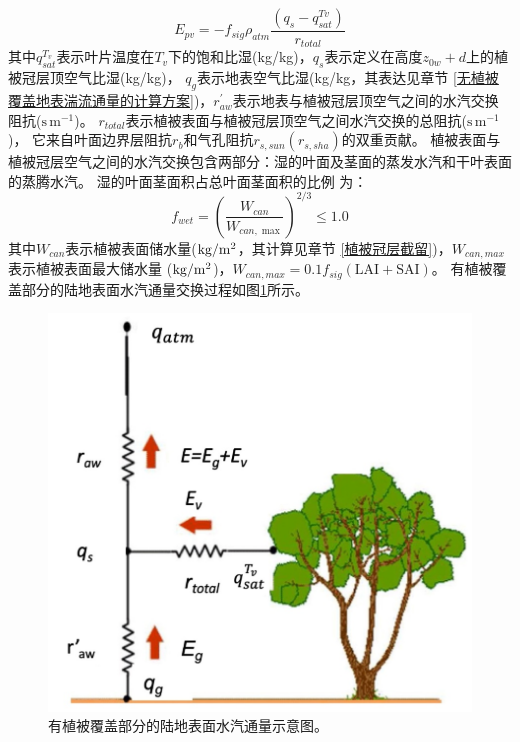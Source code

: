 \begin{equation}
E_{pv}=-f_{sig} \rho_{atm} \frac{\left(q_{s}-q_{s a t}^{T v}\right)}{r_{t o t a l}}
\end{equation}
其中$q_{sat}^{T_v}$表示叶片温度在$T_v$下的饱和比湿(kg/kg)，$q_s$表示定义在高度$z_{0w}+d$上的植被冠层顶空气比湿(kg/kg)，
$q_g$表示地表空气比湿(kg/kg，其表达见章节 \ref{无植被覆盖地表湍流通量的计算方案})，$r_{aw}^\prime$表示地表与植被冠层顶空气之间的水汽交换阻抗($\mathrm{s\,m^{-1}}$)。
$r_{total}$表示植被表面与植被冠层顶空气之间水汽交换的总阻抗($\mathrm{s\,m^{-1}}$)，
它来自叶面边界层阻抗$r_b$和气孔阻抗$r_{s,sun}\left(r_{s,sha}\right)$的双重贡献。
植被表面与植被冠层空气之间的水汽交换包含两部分：湿的叶面及茎面的蒸发水汽和干叶表面的蒸腾水汽。
湿的叶面茎面积占总叶面茎面积的比例 \citep{dickinson1993biosphere} 为：
\begin{equation}
f_{w e t}=\left(\frac{W_{c a n}}{W_{c a n, \max }}\right)^{2 / 3} \leq 1.0
\end{equation}
其中$W_{can}$表示植被表面储水量($\rm kg/m^2$，其计算见章节 \ref{植被冠层截留})，$W_{can,max}$表示植被表面最大储水量
($\rm kg/m^2$)，$W_{can,max}=0.1f_{sig}\left(\text {LAI}+ \text {SAI}\right)$。
有植被覆盖部分的陆地表面水汽通量交换过程如图\ref{fig:有植被覆盖部分的陆地表面水汽通量示意图}所示。
{
\begin{figure}[]
\centering
\includegraphics{Figures/地表湍流交换过程/有植被覆盖部分的陆地表面水汽通量示意图.png}
\caption{有植被覆盖部分的陆地表面水汽通量示意图。}
\label{fig:有植被覆盖部分的陆地表面水汽通量示意图}
\end{figure}
}
